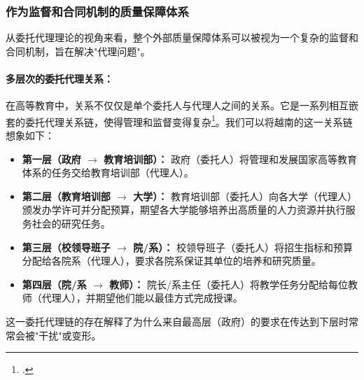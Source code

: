


\subsubsection{作为监督和合同机制的质量保障体系}

从委托代理理论的视角来看，整个外部质量保障体系可以被视为一个复杂的监督和合同机制，旨在解决"代理问题"。

\paragraph{多层次的委托代理关系：}
在高等教育中，关系不仅仅是单个委托人与代理人之间的关系。它是一系列相互嵌套的委托代理关系链，使得管理和监督变得复杂\footcite{Borgos2013}。我们可以将越南的这一关系链想象如下：
\begin{itemize}
    \item \textbf{第一层（政府 $\rightarrow$ 教育培训部）：} 政府（委托人）将管理和发展国家高等教育体系的任务交给教育培训部（代理人）。
    \item \textbf{第二层（教育培训部 $\rightarrow$ 大学）：} 教育培训部（委托人）向各大学（代理人）颁发办学许可并分配预算，期望各大学能够培养出高质量的人力资源并执行服务社会的研究任务。
    \item \textbf{第三层（校领导班子 $\rightarrow$ 院/系）：} 校领导班子（委托人）将招生指标和预算分配给各院系（代理人），要求各院系保证其单位的培养和研究质量。
    \item \textbf{第四层（院/系 $\rightarrow$ 教师）：} 院长/系主任（委托人）将教学任务分配给每位教师（代理人），并期望他们能以最佳方式完成授课。
\end{itemize}
这一委托代理链的存在解释了为什么来自最高层（政府）的要求在传达到下层时常常会被"干扰"或变形。

